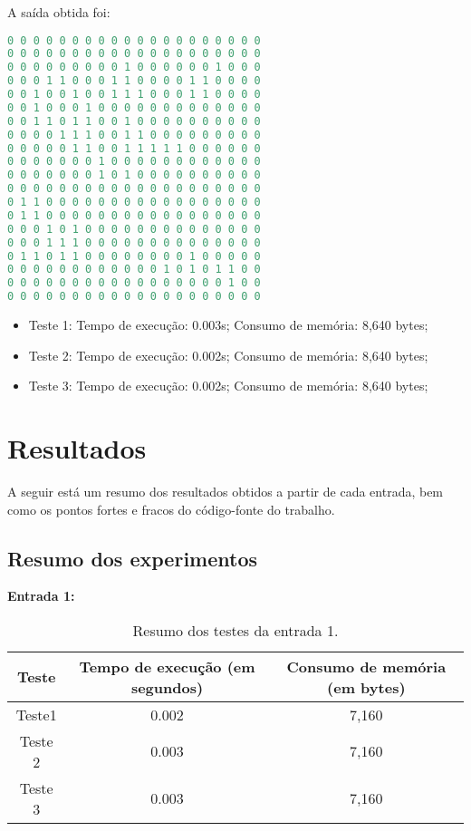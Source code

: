 \documentclass{article}
\begin{document}
 \hfill\break
 
\noindent A saída obtida foi: 
 \begin{lstlisting}[caption={Saída 2.},label={lst:cod8},language=C]
0 0 0 0 0 0 0 0 0 0 0 0 0 0 0 0 0 0 0 0
0 0 0 0 0 0 0 0 0 0 0 0 0 0 0 0 0 0 0 0
0 0 0 0 0 0 0 0 0 1 0 0 0 0 0 0 1 0 0 0
0 0 0 1 1 0 0 0 1 1 0 0 0 0 1 1 0 0 0 0
0 0 1 0 0 1 0 0 1 1 1 0 0 0 1 1 0 0 0 0
0 0 1 0 0 0 1 0 0 0 0 0 0 0 0 0 0 0 0 0
0 0 1 1 0 1 1 0 0 1 0 0 0 0 0 0 0 0 0 0
0 0 0 0 1 1 1 0 0 1 1 0 0 0 0 0 0 0 0 0
0 0 0 0 0 1 1 0 0 1 1 1 1 1 0 0 0 0 0 0
0 0 0 0 0 0 0 1 0 0 0 0 0 0 0 0 0 0 0 0
0 0 0 0 0 0 0 1 0 1 0 0 0 0 0 0 0 0 0 0
0 0 0 0 0 0 0 0 0 0 0 0 0 0 0 0 0 0 0 0
0 1 1 0 0 0 0 0 0 0 0 0 0 0 0 0 0 0 0 0
0 1 1 0 0 0 0 0 0 0 0 0 0 0 0 0 0 0 0 0
0 0 0 1 0 1 0 0 0 0 0 0 0 0 0 0 0 0 0 0
0 0 0 1 1 1 0 0 0 0 0 0 0 0 0 0 0 0 0 0
0 1 1 0 1 1 0 0 0 0 0 0 0 0 1 0 0 0 0 0
0 0 0 0 0 0 0 0 0 0 0 0 1 0 1 0 1 1 0 0
0 0 0 0 0 0 0 0 0 0 0 0 0 0 0 0 0 1 0 0
0 0 0 0 0 0 0 0 0 0 0 0 0 0 0 0 0 0 0 0
 \end{lstlisting}
 
 \hfill\break
 
\begin{itemize}
\item Teste 1: Tempo de execução: 0.003s; Consumo de memória: 8,640  bytes;
\item Teste 2: Tempo de execução: 0.002s; Consumo de memória: 8,640 bytes;
\item Teste 3: Tempo de execução: 0.002s; Consumo de memória: 8,640  bytes;
\end{itemize}
\clearpage



\clearpage
\section{Resultados}

\DESCRICAO{}

A seguir está um resumo dos resultados obtidos a partir de cada entrada, bem como os pontos fortes e fracos do código-fonte do trabalho.

\subsection{Resumo dos experimentos}

\noindent \textbf{Entrada 1:}
\begin{table}[!htb]
    \centering
    \begin{tabular}{|c | c | c |}
        \hline
        Teste & Tempo de execução (em segundos) & Consumo de memória (em bytes) \\\hline
        Teste1 & 0.002 & 7,160  \\\hline
        Teste 2 & 0.003 & 7,160 \\\hline
        Teste 3 & 0.003 & 7,160 \\\hline
    \end{tabular}
    \caption{\label{tab:widgets}Resumo dos testes da entrada 1.}
\end{table}
\end{document}
